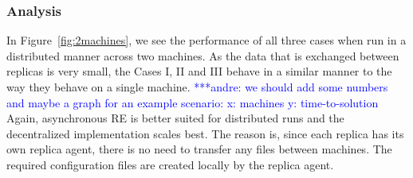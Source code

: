\documentclass[a4paper,10pt]{article}
\newcommand{\alnote}[1]{ {\textcolor{blue} { ***andre: #1 }}}
\newcommand{\athotanote}[1]{ {\textcolor{green} { ***athota: #1 }}}
\newcommand{\alnote}[1]{}
\newcommand{\athotanote}[1]{}
\begin{document}
\subsubsection{Analysis}
In Figure~\ref{fig:2machines}, we see the performance of all three cases when run in a distributed manner across two machines. As the data that is exchanged between replicas is very small, the Cases I, II and III behave in a similar manner to the way they behave on a single machine. \alnote{we should add some numbers and maybe a graph for an example scenario: x: machines y: time-to-solution} Again, asynchronous RE is better suited for distributed runs and the decentralized implementation scales best. The reason is, since each replica has its own replica agent, there is no need to transfer any files between machines. The required configuration files are created locally by the replica agent.


\end{document}
